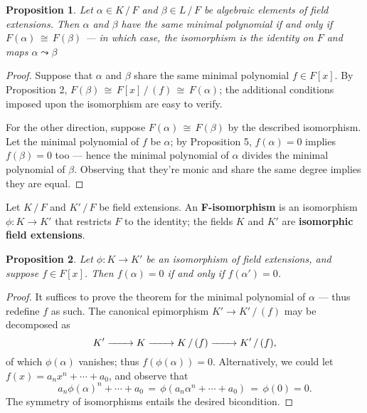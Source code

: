 \documentclass[11pt]{article}
\newtheorem{proposition}{Proposition}
\renewcommand{\longrightarrow}{\xrightarrow{\hspace*{0.7cm}}}
\begin{document}
\begin{adjustwidth}{0.5cm}{}
  \begin{proposition}
    Let $\alpha \in K \, / \, F$ and $\beta \in L \, / \, F$ be algebraic elements of field extensions. Then $\alpha$ and $\beta$ have the same minimal polynomial if and only if $F(\alpha) \, \cong \, F(\beta)$ --- in which case, the isomorphism is the identity on $F$ and maps $\alpha \leadsto \beta$
  \end{proposition}
  \begin{proof}
    Suppose that $\alpha$ and $\beta$ share the same minimal polynomial $f \in F[x]$. By Proposition 2, $F(\beta) \, \cong \, F[x] \, / \, (f) \, \cong \, F(\alpha)$; the additional conditions imposed upon the isomorphism are easy to verify.

    For the other direction,  suppose $F(\alpha) \, \cong \, F(\beta)$ by the described isomorphism. Let the minimal polynomial of $f$ be $\alpha$; by Proposition 5, $f(\alpha) = 0$ implies $f(\beta) = 0$ too --- hence the minimal polynomial of $\alpha$ divides the minimal polynomial of $\beta$. Observing that they're monic and share the same degree implies they are equal.
  \end{proof}
\end{adjustwidth}

Let $K \, / \, F$ and $K' \, / \, F$ be field extensions. An \textbf{F-isomorphism} is an isomorphism $\phi : K \to K'$ that restricts $F$ to the identity; the fields $K$ and $K'$ are \textbf{isomorphic field extensions}.

\begin{adjustwidth}{0.5cm}{}
  \begin{proposition}
    Let $\phi : K \to K'$ be an isomorphism of field extensions, and suppose $f \in F[x]$. Then $f(\alpha) = 0$ if and only if $f(\alpha') = 0$.
  \end{proposition}
  \begin{proof}
    It suffices to prove the theorem for the minimal polynomial of $\alpha$ --- thus redefine $f$ as such. The canonical epimorphism $K' \to K' \, / \, (f)$ may be decomposed as
    \[
      K' \longrightarrow K \longrightarrow K \, / \, (f) \longrightarrow K' \, / \, (f),
    \]
    of which $\phi(\alpha)$ vanishes; thus $f(\phi(\alpha)) = 0$. Alternatively, we could let $f(x) = a_{n}x^{n} + \cdots + a_{0}$, and observe that
    \[
      a_{n} \phi(\alpha)^{n} + \cdots + a_{0} \, = \, \phi(a_{n} \alpha^{n} + \cdots + a_{0}) \, = \, \phi(0) = 0.
    \]
    The symmetry of isomorphisms entails the desired bicondition.
  \end{proof}
\end{adjustwidth}
\end{document}
